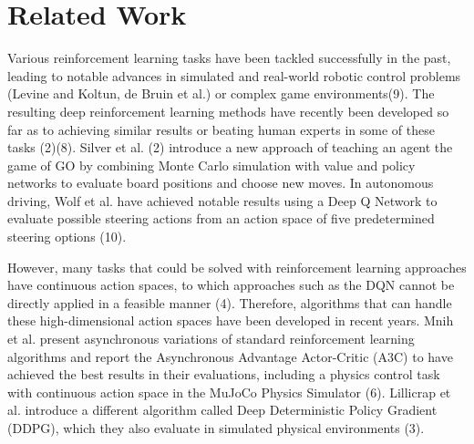 \documentclass[letterpaper, 10 pt, conference]{ieeeconf}  %
\begin{document}

\section{Related Work}

Various reinforcement learning tasks have been tackled successfully in the past, leading to notable advances in simulated and real-world robotic control problems (Levine and Koltun, de Bruin et al.) or complex game environments(9). The resulting deep reinforcement learning methods have recently been developed so far as to achieving similar results or beating human experts in some of these tasks (2)(8). Silver et al. (2) introduce a new approach of teaching an agent the game of GO by combining Monte Carlo simulation with value and policy networks to evaluate board positions and choose new moves. In autonomous driving, Wolf et al. have achieved notable results using a Deep Q Network to evaluate possible steering actions from an action space of five predetermined steering options (10). 

However, many tasks that could be solved with reinforcement learning approaches have continuous action spaces, to which approaches such as the DQN cannot be directly applied in a feasible manner (4). Therefore, algorithms that can handle these high-dimensional action spaces have been developed in recent years. Mnih et al. present asynchronous variations of standard reinforcement learning algorithms and report the Asynchronous Advantage Actor-Critic (A3C) to have achieved the best results in their evaluations, including a physics control task with continuous action space in the MuJoCo Physics Simulator (6). Lillicrap et al. introduce a different algorithm called Deep Deterministic Policy Gradient (DDPG), which they also evaluate in simulated physical environments (3).
\end{document}
